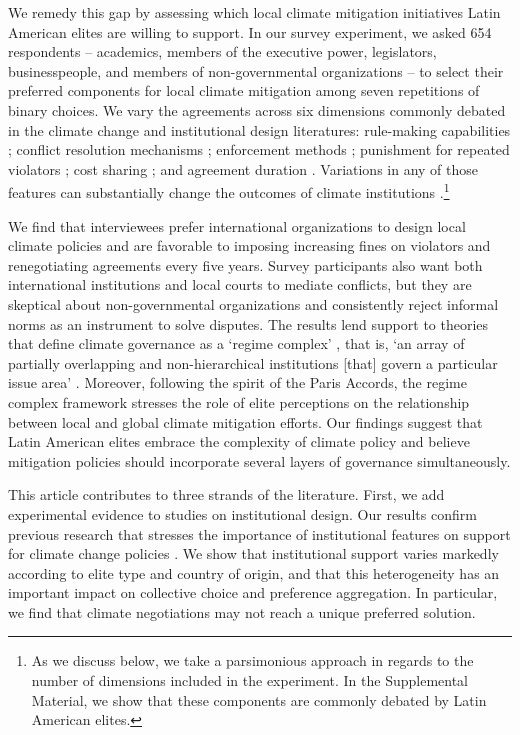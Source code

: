 \documentclass[a4paper,12pt]{article}
\begin{document}
We remedy this gap by assessing which local climate mitigation initiatives Latin American elites are willing to support. In our survey experiment, we asked 654 respondents -- academics, members of the executive power, legislators, businesspeople, and members of non-governmental organizations -- to select their preferred components for local climate mitigation among seven repetitions of binary choices. We vary the agreements across six dimensions commonly debated in the climate change and institutional design literatures: rule-making capabilities \citep{dubash2013developments, massey2014climate}; conflict resolution mechanisms \citep{huntjens2012institutional, ostrom2014polycentric}; enforcement methods \citep{barrett2008climate}; punishment for repeated violators \citep{ostrom1990governing}; cost sharing \citep{bansak2017europeans,bechtel2013mass}; and agreement duration \citep{copelovitch2014design, marcoux2009institutional}. Variations in any of those features can substantially change the outcomes of climate institutions \citep{bodin2017collaborative, ostrom2014polycentric}.\footnote{As we discuss below, we take a parsimonious approach in regards to the number of dimensions included in the experiment. In the Supplemental Material, we show that these components are commonly debated by Latin American elites.}

We find that interviewees prefer international organizations to design local climate policies and are favorable to imposing increasing fines on violators and renegotiating agreements every five years. Survey participants also want both international institutions and local courts to mediate conflicts, but they are skeptical about non-governmental organizations and consistently reject informal norms as an instrument to solve disputes. The results lend support to theories that define climate governance as a `regime complex' \citep{colgan2012punctuated, keohane2011regime}, that is, `an array of partially overlapping and non-hierarchical institutions [that] govern a particular issue area' \citep[279]{raustiala2004regime}. Moreover, following the spirit of the Paris Accords, the regime complex framework stresses the role of elite perceptions on the relationship between local and global climate mitigation efforts. Our findings suggest that Latin American elites embrace the complexity of climate policy and believe mitigation policies should incorporate several layers of governance simultaneously.

This article contributes to three strands of the literature. First, we add experimental evidence to studies on institutional design. Our results confirm previous research that stresses the importance of institutional features on support for climate change policies \citep{aklin2013understanding, bechtel2013mass, bechtel2017interests}. We show that institutional support varies markedly according to elite type and country of origin, and that this heterogeneity has an important impact on collective choice and preference aggregation. In particular, we find that climate negotiations may not reach a unique preferred solution.
\end{document}
